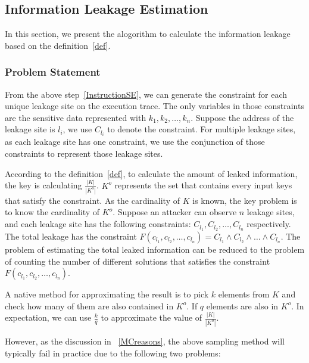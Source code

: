 \subsection{Information Leakage Estimation}

\newcommand{\addr}[1]{l_{#1}}

In this section, we present the alogorithm to calculate the information
leakage based on the definition~\ref{def}. 

\subsubsection{Problem Statement}
From the above step~\ref{InstructionSE}, we can generate the constraint 
for each unique leakage site on the execution trace.
The only variables in those constraints are the sensitive data represented
with $k_1, k_2, \ldots , k_n$. Suppose the address of the leakage site is $\addr{i}$,
we use $C_{\addr{i}}$ to denote the constraint. For multiple leakage sites, 
as each leakage site has one constraint, we 
use the conjunction of those constraints to represent those leakage sites. 

According to the definition~\ref{def}, to calculate the amount of leaked 
information, the key is calculating $\frac{|K|}{|K^o|}$. $K^o$ represents
the set that contains every input keys that satisfy the constraint. As the 
cardinality of $K$ is known, the key problem is to know the cardinality of
$K^o$. Suppose an attacker can observe $n$ leakage sites, and each leakage site has
the following constraints: $C_{\addr{1}}, C_{\addr{2}}, \ldots, C_{\addr{n}}$ respectively. 
The total leakage has the constraint 
$F(c_{\addr{1}},c_{\addr{2}},\ldots,c_{\addr{n}}) = C_{\addr{1}} \land C_{\addr{2}} 
\land \ldots \land C_{\addr{n}}$. The problem of estimating the total leaked information 
can be reduced to the problem of counting the number of different solutions 
that satisfies the constraint $F(c_{\addr{1}},c_{\addr{2}},\ldots,c_{\addr{n}})$. 

A native method for approximating 
the result is to pick $k$ elements from $K$ and check how many of them are also
contained in $K^o$. If $q$ elements are also in $K^o$. In expectation, we can
use $\frac{k}{q}$ to approximate the value of $\frac{|K|}{|K^o|}$.

However, as the discussion in ~\ref{MCreasons},
the above sampling method will typically fail in practice due to the following two problems:

